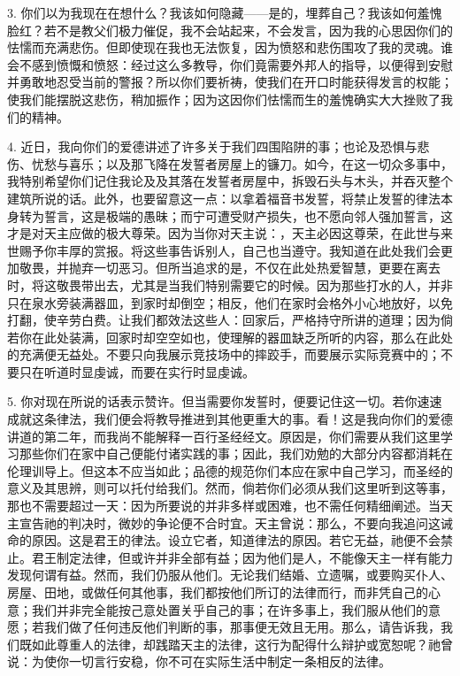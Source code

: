 3. 你们以为我现在在想什么？我该如何隐藏——是的，埋葬自己？我该如何羞愧脸红？若不是教父们极力催促，我不会站起来，不会发言，因为我的心思因你们的怯懦而充满悲伤。但即使现在我也无法恢复，因为愤怒和悲伤围攻了我的灵魂。谁会不感到愤慨和愤怒：经过这么多教导，你们竟需要外邦人的指导，以便得到安慰并勇敢地忍受当前的警报？所以你们要祈祷，使我们在开口时能获得发言的权能；使我们能摆脱这悲伤，稍加振作；因为这因你们怯懦而生的羞愧确实大大挫败了我们的精神。\par

4. 近日，我向你们的爱德讲述了许多关于我们四围陷阱的事；也论及恐惧与悲伤、忧愁与喜乐；以及那飞降在发誓者房屋上的镰刀。如今，在这一切众多事中，我特别希望你们记住我论及及其落在发誓者房屋中，拆毁石头与木头，并吞灭整个建筑所说的话。此外，也要留意这一点：以拿着福音书发誓，将禁止发誓的律法本身转为誓言，这是极端的愚昧；而宁可遭受财产损失，也不愿向邻人强加誓言，这才是对天主应做的极大尊荣。因为当你对天主说：，天主必因这尊荣，在此世与来世赐予你丰厚的赏报。将这些事告诉别人，自己也当遵守。我知道在此处我们会更加敬畏，并抛弃一切恶习。但所当追求的是，不仅在此处热爱智慧，更要在离去时，将这敬畏带出去，尤其是当我们特别需要它的时候。因为那些打水的人，并非只在泉水旁装满器皿，到家时却倒空；相反，他们在家时会格外小心地放好，以免打翻，使辛劳白费。让我们都效法这些人：回家后，严格持守所讲的道理；因为倘若你在此处装满，回家时却空空如也，使理解的器皿缺乏所听的内容，那么在此处的充满便无益处。不要只向我展示竞技场中的摔跤手，而要展示实际竞赛中的；不要只在听道时显虔诚，而要在实行时显虔诚。\par

5. 你对现在所说的话表示赞许。但当需要你发誓时，便要记住这一切。若你速速成就这条律法，我们便会将教导推进到其他更重大的事。看！这是我向你们的爱德讲道的第二年，而我尚不能解释一百行圣经经文。原因是，你们需要从我们这里学习那些你们在家中自己便能付诸实践的事；因此，我们劝勉的大部分内容都消耗在伦理训导上。但这本不应当如此；品德的规范你们本应在家中自己学习，而圣经的意义及其思辨，则可以托付给我们。然而，倘若你们必须从我们这里听到这等事，那也不需要超过一天：因为所要说的并非多样或困难，也不需任何精细阐述。当天主宣告祂的判决时，微妙的争论便不合时宜。天主曾说：那么，不要向我追问这诫命的原因。这是君王的律法。设立它者，知道律法的原因。若它无益，祂便不会禁止。君王制定法律，但或许并非全部有益；因为他们是人，不能像天主一样有能力发现何谓有益。然而，我们仍服从他们。无论我们结婚、立遗嘱，或要购买仆人、房屋、田地，或做任何其他事，我们都按他们所订的法律而行，而非凭自己的心意；我们并非完全能按己意处置关乎自己的事；在许多事上，我们服从他们的意愿；若我们做了任何违反他们判断的事，那事便无效且无用。那么，请告诉我，我们既如此尊重人的法律，却践踏天主的法律，这行为配得什么辩护或宽恕呢？祂曾说：为使你一切言行安稳，你不可在实际生活中制定一条相反的法律。\par

